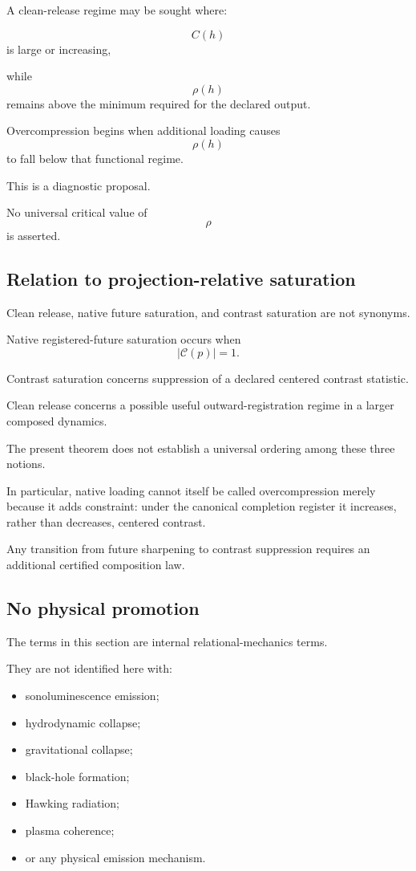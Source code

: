 A clean-release regime may be sought where:

\[
C(h)
\]
is large or increasing,

while
\[
\rho(h)
\]
remains above the minimum required for the declared output.

Overcompression begins when additional loading causes
\[
\rho(h)
\]
to fall below that functional regime.

This is a diagnostic proposal.

No universal critical value of
\[
\rho
\]
is asserted.

\subsection{Relation to projection-relative saturation}


Clean release, native future saturation, and contrast saturation are
not synonyms.

Native registered-future saturation occurs when
\[
|\mathcal C(p)|=1.
\]

Contrast saturation concerns suppression of a declared centered
contrast statistic.

Clean release concerns a possible useful outward-registration regime
in a larger composed dynamics.

The present theorem does not establish a universal ordering among
these three notions.

In particular, native loading cannot itself be called overcompression
merely because it adds constraint: under the canonical completion
register it increases, rather than decreases, centered contrast.

Any transition from future sharpening to contrast suppression requires
an additional certified composition law.

\subsection{No physical promotion}

The terms in this section are internal relational-mechanics terms.

They are not identified here with:

\begin{itemize}

\item sonoluminescence emission;

\item hydrodynamic collapse;

\item gravitational collapse;

\item black-hole formation;

\item Hawking radiation;

\item plasma coherence;

\item or any physical emission mechanism.

\end{itemize}

